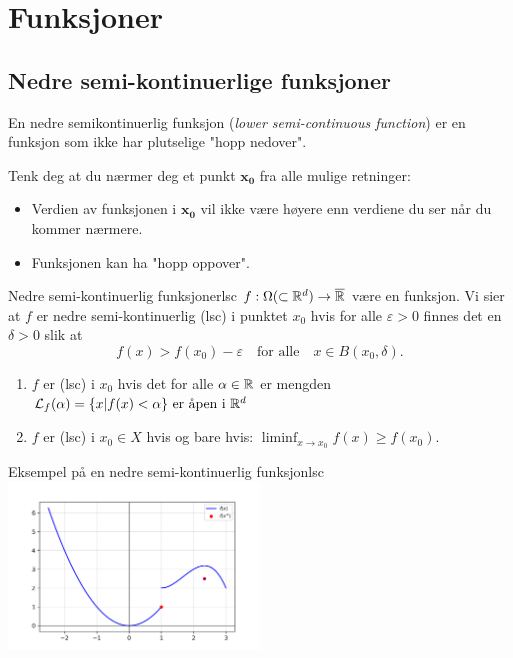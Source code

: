 \section{Funksjoner}
\subsection{Nedre semi-kontinuerlige funksjoner}
En nedre semikontinuerlig funksjon (\textit{lower semi-continuous function}) er en funksjon som ikke har plutselige "hopp nedover".

Tenk deg at du nærmer deg et punkt \( \symbf{x_0} \) fra alle mulige retninger:
\begin{itemize}
	\item Verdien av funksjonen i \( \symbf{x_0} \) vil ikke være høyere enn verdiene du ser når du kommer nærmere.
	\item Funksjonen kan ha "hopp oppover".
\end{itemize}


\begin{definition}{Nedre semi-kontinuerlig funksjoner}{lsc}
	\(f: \Omega (\subset \mathbb{R}^d) \to \overline{\mathbb{R}}\) være en funksjon. Vi sier at \(f\) er nedre semi-kontinuerlig (lsc) i punktet \(x_0\) hvis for alle \(\varepsilon > 0\) finnes det en \(\delta > 0\) slik at
	\[
		f(x) > f(x_0) - \varepsilon \quad \text{for alle} \quad x \in B(x_0, \delta).
	\]
	\begin{enumerate}
		\item \(f\) er (lsc) i \(x_0\) hvis det for alle \(\alpha \in \mathbb{R}\) er mengden \(\mathcal{L}_f(\alpha) = \{x | f(x) < \alpha \} \text{ er åpen i } \mathbb{R}^d\)
		\item \(f\) er (lsc) i \(x_0 \in X\) hvis og bare hvis: \(\liminf_{x \to x_0} f(x) \geq f(x_0)\).
	\end{enumerate}
\end{definition}
\begin{example}{Eksempel på en nedre semi-kontinuerlig funksjon}{lsc}
	\includegraphics[width=0.5\textwidth]{figures/example_lsc.png}
\end{example}

